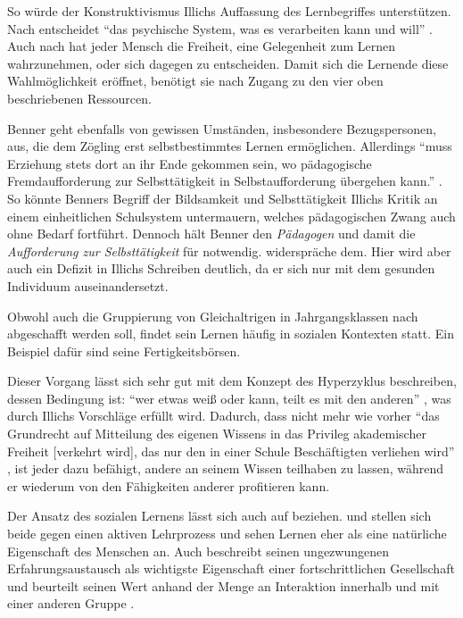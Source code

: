 So würde der Konstruktivismus Illichs Auffassung des Lernbegriffes unterstützen.
Nach \citeauthor{siebert-2003} entscheidet ``das psychische System, was es verarbeiten kann und will'' \parencite[13]{siebert-2003}.
Auch nach \citeauthor{Illich-1971} hat jeder Mensch die Freiheit, eine Gelegenheit zum Lernen wahrzunehmen, oder sich dagegen zu entscheiden.
Damit sich die Lernende diese Wahlmöglichkeit eröffnet, benötigt sie nach \citeauthor{Illich-1971} Zugang zu den vier oben beschriebenen Ressourcen.

Benner geht ebenfalls von gewissen Umständen, insbesondere Bezugspersonen, aus, die dem Zögling erst selbstbestimmtes Lernen ermöglichen.
Allerdings ``muss Erziehung stets dort an ihr Ende gekommen sein, wo pädagogische Fremdaufforderung zur Selbsttätigkeit in Selbstaufforderung übergehen kann.'' \parencite[91]{benner-2012}.
So könnte Benners Begriff der Bildsamkeit und Selbsttätigkeit Illichs Kritik an einem einheitlichen Schulsystem untermauern, welches pädagogischen Zwang auch ohne Bedarf fortführt.
Dennoch hält Benner den \emph{Pädagogen} und damit die \emph{Aufforderung zur Selbsttätigkeit} für notwendig.
\citeauthor{Illich-1971} widerspräche dem.
Hier wird aber auch ein Defizit in Illichs Schreiben deutlich, da er sich nur mit dem gesunden Individuum auseinandersetzt.

Obwohl auch die Gruppierung von Gleichaltrigen in Jahrgangsklassen nach \citeauthor{Illich-1971} abgeschafft werden soll, findet sein Lernen häufig in sozialen Kontexten statt.
Ein Beispiel dafür sind seine Fertigkeitsbörsen.

Dieser Vorgang lässt sich sehr gut mit dem Konzept des Hyperzyklus beschreiben, dessen Bedingung ist: ``wer etwas weiß oder kann, teilt es mit den anderen'' \parencite[123]{Zimpel2012}, was durch Illichs Vorschläge erfüllt wird.
Dadurch, dass nicht mehr wie vorher ``das Grundrecht auf Mitteilung des eigenen Wissens in das Privileg akademischer Freiheit [verkehrt wird], das nur den in einer Schule Beschäftigten verliehen wird'' \parencite[97]{Illich-1973}, ist jeder dazu befähigt, andere an seinem Wissen teilhaben zu lassen, während er wiederum von den Fähigkeiten anderer profitieren kann.

Der Ansatz des sozialen Lernens lässt sich auch auf \citeauthor{Dewey2010} beziehen.
\citeauthor{Illich-1971} und \citeauthor{Dewey2010} stellen sich beide gegen einen aktiven Lehrprozess und sehen Lernen eher als eine natürliche Eigenschaft des Menschen an.
Auch \citeauthor{Dewey2010} beschreibt seinen ungezwungenen Erfahrungsaustausch als wichtigste Eigenschaft einer fortschrittlichen Gesellschaft und beurteilt seinen Wert anhand der Menge an Interaktion innerhalb und mit einer anderen Gruppe \parencite[vgl.][89]{Dewey2010}.

